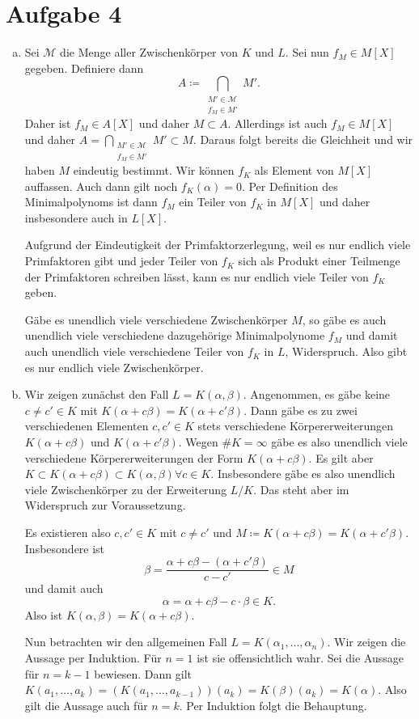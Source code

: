 \documentclass{article}
\begin{document}
    \section*{Aufgabe 4}
    \begin{enumerate}[(a)]
        \item Sei $\mathscr{M}$ die Menge aller Zwischenkörper von $K$ und $L$. Sei nun $f_M \in M[X]$ gegeben. Definiere dann
        \[
            A \coloneqq \bigcap_{\substack{M' \in \mathscr{M}\\ f_M \in M'}} M'.
        \]
        Daher ist $f_M \in A[X]$ und daher $M \subset A$. Allerdings ist auch $f_M \in M[X]$ und daher $A =\bigcap_{\substack{M' \in \mathscr{M}\\ f_M \in M'}} M' \subset M$. Daraus folgt bereits die Gleichheit und wir haben $M$ eindeutig bestimmt. 
        Wir können $f_K$ als Element von $M[X]$ auffassen. Auch dann gilt noch $f_K(\alpha) = 0$. 
        Per Definition des Minimalpolynoms ist dann $f_M$ ein Teiler von $f_K$ in $M[X]$ und daher insbesondere auch in $L[X]$.
        
        Aufgrund der Eindeutigkeit der Primfaktorzerlegung, weil es nur endlich viele Primfaktoren gibt und jeder Teiler von $f_K$ sich als Produkt einer Teilmenge der Primfaktoren schreiben lässt, kann es nur endlich viele Teiler von $f_K$ geben. 
        
        Gäbe es unendlich viele verschiedene Zwischenkörper $M$, so gäbe es auch unendlich viele verschiedene dazugehörige Minimalpolynome $f_M$ und damit auch unendlich viele verschiedene Teiler von $f_K$ in $L$, Widerspruch. Also gibt es nur endlich viele Zwischenkörper.
        \item Wir zeigen zunächst den Fall $L = K(\alpha, \beta)$. Angenommen, es gäbe keine $c \neq c'\in K$ mit $K(\alpha + c\beta) = K(\alpha + c'\beta)$. Dann gäbe es zu zwei verschiedenen Elementen $c, c' \in K$ stets verschiedene Körpererweiterungen $K(\alpha + c\beta)$ und  $K(\alpha + c'\beta)$. Wegen $\# K = \infty$ gäbe es also unendlich viele verschiedene Körpererweiterungen der Form $K(\alpha + c \beta)$. Es gilt aber $K \subset K(\alpha + c \beta) \subset K(\alpha, \beta) \forall c \in K$. Insbesondere gäbe es also unendlich viele Zwischenkörper zu der Erweiterung $L/K$. Das steht aber im Widerspruch zur Voraussetzung. 
        
        Es existieren also $c, c' \in K$ mit $c \neq c'$ und $M \coloneqq K(\alpha + c\beta) = K(\alpha + c'\beta)$. Insbesondere ist 
        \[
         \beta = \frac{\alpha + c \beta - (\alpha + c'\beta)}{c - c'} \in M
        \] und damit auch 
        \[
            \alpha = \alpha + c \beta - c \cdot \beta \in K.
        \]
        Also ist $K(\alpha, \beta) = K(\alpha + c\beta)$.

        Nun betrachten wir den allgemeinen Fall $L = K(\alpha_1, \dots, \alpha_n)$. Wir zeigen die Aussage per Induktion. Für $n=1$ ist sie offensichtlich wahr.
        Sei die Aussage für $n= k-1$ bewiesen. Dann gilt
        $K(a_1, \dots, a_k) = (K(a_1, \dots, a_{k-1}))(a_k) = K(\beta)(a_k) = K(\alpha)$. Also gilt die Aussage auch für $n = k$. Per Induktion folgt die Behauptung.
    \end{enumerate}
\end{document}
